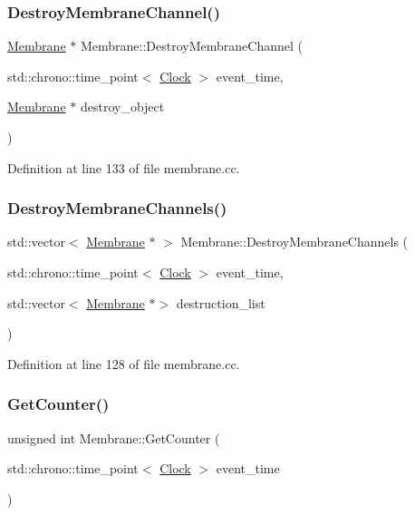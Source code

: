 \subsubsection{\texorpdfstring{Destroy\+Membrane\+Channel()}{DestroyMembraneChannel()}}
{\footnotesize\ttfamily \mbox{\hyperlink{class_membrane}{Membrane}} $\ast$ Membrane\+::\+Destroy\+Membrane\+Channel (\begin{DoxyParamCaption}\item[{std\+::chrono\+::time\+\_\+point$<$ \mbox{\hyperlink{universe_8h_a0ef8d951d1ca5ab3cfaf7ab4c7a6fd80}{Clock}} $>$}]{event\+\_\+time,  }\item[{\mbox{\hyperlink{class_membrane}{Membrane}} $\ast$}]{destroy\+\_\+object }\end{DoxyParamCaption})}



Definition at line 133 of file membrane.\+cc.

\mbox{\label{class_membrane_aea71c4443f2fc22359ac3f770ff7755e}} 
\subsubsection{\texorpdfstring{Destroy\+Membrane\+Channels()}{DestroyMembraneChannels()}}
{\footnotesize\ttfamily std\+::vector$<$ \mbox{\hyperlink{class_membrane}{Membrane}} $\ast$ $>$ Membrane\+::\+Destroy\+Membrane\+Channels (\begin{DoxyParamCaption}\item[{std\+::chrono\+::time\+\_\+point$<$ \mbox{\hyperlink{universe_8h_a0ef8d951d1ca5ab3cfaf7ab4c7a6fd80}{Clock}} $>$}]{event\+\_\+time,  }\item[{std\+::vector$<$ \mbox{\hyperlink{class_membrane}{Membrane}} $\ast$$>$}]{destruction\+\_\+list }\end{DoxyParamCaption})}



Definition at line 128 of file membrane.\+cc.

\mbox{\label{class_membrane_a85f8b2633ff32f79b6fbb466ce690858}} 
\subsubsection{\texorpdfstring{Get\+Counter()}{GetCounter()}}
{\footnotesize\ttfamily unsigned int Membrane\+::\+Get\+Counter (\begin{DoxyParamCaption}\item[{std\+::chrono\+::time\+\_\+point$<$ \mbox{\hyperlink{universe_8h_a0ef8d951d1ca5ab3cfaf7ab4c7a6fd80}{Clock}} $>$}]{event\+\_\+time }\end{DoxyParamCaption})\hspace{0.3cm}{\ttfamily [inline]}}



